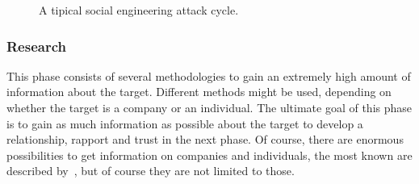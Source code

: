 \begin{figure}
  \begin{center}

    \caption{A tipical social engineering attack cycle.}
  \end{center}
\end{figure}

\subsubsection{Research}

This phase consists of several methodologies to gain an extremely high amount of
information about the target. Different methods might be used, depending on
whether the target is a company or an individual. The ultimate goal of this
phase is to gain as much information as possible about the target to develop a
relationship, rapport and trust in the next phase. Of course, there are
enormous possibilities to get information on companies and individuals, the
most known are described by~\cite{jones2004,mitnick2003,thornburgh2004}, but of
course they are not limited to those.

